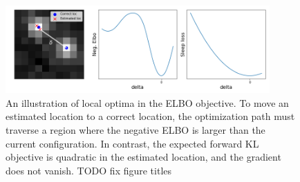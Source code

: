 \begin{figure}[!htb]
    \centering
    \includegraphics[width=0.9\textwidth]{figures/elbo_vs_sleep/local_minima_cartoon.png}
    \vspace{-0.5cm}
    \caption{An illustration of local optima in the ELBO objective.
    To move an estimated location to a correct location,
    the optimization path must traverse a region where the negative ELBO is larger than the current configuration.
    In contrast, the expected forward KL objective is quadratic in the estimated location,
    and the gradient does not vanish. TODO fix figure titles }
    \label{fig:local_optima_cartoon}
\end{figure}







